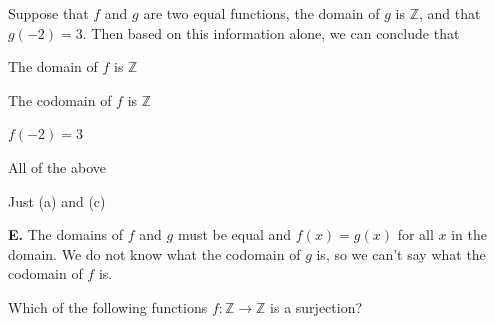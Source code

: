 \documentclass[addpoints]{exam}
\begin{document}
\begin{questions}
\question[2] Suppose that $f$ and $g$ are two equal functions, the domain of $g$ is $\mathbb{Z}$, and that $g(-2) = 3$. Then based on this information alone, we can conclude that 
	\begin{parts}
		\item The domain of $f$ is $\mathbb{Z}$
		\item The codomain of $f$ is $\mathbb{Z}$
		\item $f(-2) = 3$
		\item All of the above
		\item Just (a) and (c)
	\end{parts}

	\begin{solution}
		\textbf{E.} The domains of $f$ and $g$ must be equal and $f(x) = g(x)$ for all $x$ in the domain. We do not know what the codomain of $g$ is, so we can't say what the codomain of $f$ is. 
	\end{solution}




\question[2] Which of the following functions $f: \mathbb{Z} \to \mathbb{Z}$ is a surjection? 


\end{questions}
\end{document}
